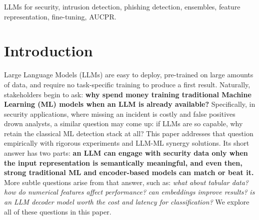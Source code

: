 \documentclass{jmlr}
\begin{document}
\begin{abstract}
The ensemble results reinforce this. On the network tasks, routing uncertain examples to an at-chance LLM reduces AUCPR as more traffic is escalated, and stacking decoder LLM outputs with traditional model outputs leaves flow performance unchanged. The picture is more nuanced where the LLM has signal: routing and stacking can improve weaker models, and strong feature representations can make smaller decoder models competitive with larger frontier LLMs. Still, these findings suggest that practitioners building cybersecurity classification systems with sufficiently large, well-labeled datasets should evaluate traditional ML and encoder-based classification methods before adopting decoder LLMs or hybrid LLM ensembles.
\end{abstract}

\begin{keywords}
LLMs for security, intrusion detection, phishing detection, ensembles, feature
representation, fine-tuning, AUCPR.
\end{keywords}

\section{Introduction}
\label{sec:introduction}

Large Language Models (LLMs) are easy to deploy, pre-trained on large amounts of data, and require no task-specific training to produce a first result. Naturally, stakeholders begin to ask: \textbf{why spend money training traditional Machine Learning (ML) models when an LLM is already available?} Specifically, in security
applications, where missing an incident is costly and false positives drown analysts, a similar question
may come up: if LLMs are so capable, why retain the classical ML detection stack at all? This paper
addresses that question empirically with rigorous experiments and LLM-ML synergy solutions. Its short answer has two parts: \textbf{an LLM can engage with security data only when the input representation is semantically meaningful, and even then, strong traditional ML and encoder-based models can match or beat it.} More subtle questions arise from that answer, such as: \textit{what about tabular data?} \textit{how do numerical features affect performance?} \textit{can embeddings improve results?} \textit{is an LLM decoder model worth the cost and latency for classification?} We explore all of these questions in this paper.

\end{document}
